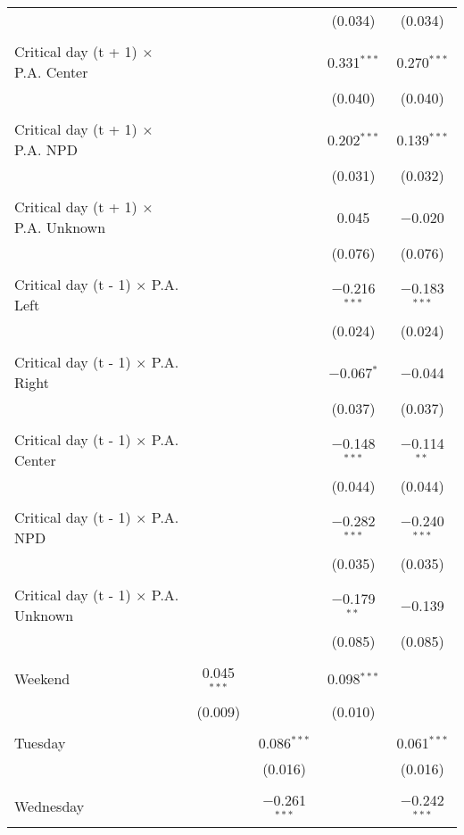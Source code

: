 \documentclass[
]{article}
\begin{document}
\begin{table}[!htbp]
{\begin{tabular}{@{\extracolsep{5pt}}lcccc}
  &  &  & (0.034) & (0.034) \\ 
  & & & & \\ 
 Critical day (t + 1) $\times$ P.A. Center &  &  & 0.331$^{***}$ & 0.270$^{***}$ \\ 
  &  &  & (0.040) & (0.040) \\ 
  & & & & \\ 
 Critical day (t + 1) $\times$ P.A. NPD &  &  & 0.202$^{***}$ & 0.139$^{***}$ \\ 
  &  &  & (0.031) & (0.032) \\ 
  & & & & \\ 
 Critical day (t + 1) $\times$ P.A. Unknown &  &  & 0.045 & $-$0.020 \\ 
  &  &  & (0.076) & (0.076) \\ 
  & & & & \\ 
 Critical day (t - 1) $\times$ P.A. Left &  &  & $-$0.216$^{***}$ & $-$0.183$^{***}$ \\ 
  &  &  & (0.024) & (0.024) \\ 
  & & & & \\ 
 Critical day (t - 1) $\times$ P.A. Right &  &  & $-$0.067$^{*}$ & $-$0.044 \\ 
  &  &  & (0.037) & (0.037) \\ 
  & & & & \\ 
 Critical day (t - 1) $\times$ P.A. Center &  &  & $-$0.148$^{***}$ & $-$0.114$^{**}$ \\ 
  &  &  & (0.044) & (0.044) \\ 
  & & & & \\ 
 Critical day (t - 1) $\times$ P.A. NPD &  &  & $-$0.282$^{***}$ & $-$0.240$^{***}$ \\ 
  &  &  & (0.035) & (0.035) \\ 
  & & & & \\ 
 Critical day (t - 1) $\times$ P.A. Unknown &  &  & $-$0.179$^{**}$ & $-$0.139 \\ 
  &  &  & (0.085) & (0.085) \\ 
  & & & & \\ 
 Weekend & 0.045$^{***}$ &  & 0.098$^{***}$ &  \\ 
  & (0.009) &  & (0.010) &  \\ 
  & & & & \\ 
 Tuesday &  & 0.086$^{***}$ &  & 0.061$^{***}$ \\ 
  &  & (0.016) &  & (0.016) \\ 
  & & & & \\ 
 Wednesday &  & $-$0.261$^{***}$ &  & $-$0.242$^{***}$ \\ 

\end{tabular}}
\end{table}
\end{document}
